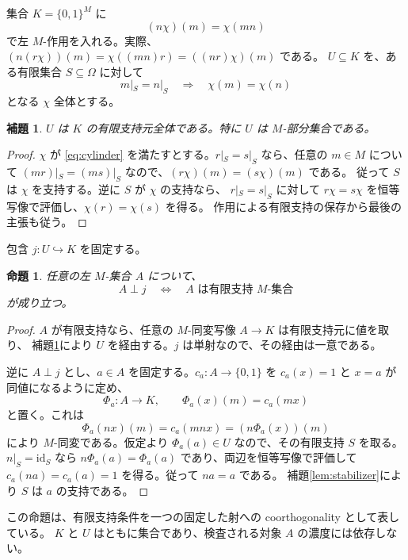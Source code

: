 \documentclass[a4paper,11pt]{ltjsarticle}
\theoremstyle{japaneseplain}
\newtheorem{lemma}[theorem]{補題}
\newtheorem{proposition}[theorem]{命題}
\newcommand{\id}{\mathrm{id}}
\begin{document}
集合 $K=\{0,1\}^{M}$ に
\begin{equation}\label{eq:cofree}
 (n\chi)(m)=\chi(mn)
\end{equation}
で左 $M$-作用を入れる。実際、
$(n(r\chi))(m)=\chi((mn)r)=((nr)\chi)(m)$ である。
$U\subseteq K$ を、ある有限集合 $S\subseteq\Omega$ に対して
\begin{equation}\label{eq:cylinder}
 m|_S=n|_S\quad\Longrightarrow\quad\chi(m)=\chi(n)
\end{equation}
となる $\chi$ 全体とする。

\begin{lemma}\label{lem:cylinder}
$U$ は $K$ の有限支持元全体である。特に $U$ は $M$-部分集合である。
\end{lemma}
\begin{proof}
$\chi$ が \eqref{eq:cylinder} を満たすとする。$r|_S=s|_S$ なら、任意の $m\in M$ について
$(mr)|_S=(ms)|_S$ なので、$(r\chi)(m)=(s\chi)(m)$ である。
従って $S$ は $\chi$ を支持する。逆に $S$ が $\chi$ の支持なら、
$r|_S=s|_S$ に対して $r\chi=s\chi$ を恒等写像で評価し、$\chi(r)=\chi(s)$ を得る。
作用による有限支持の保存から最後の主張も従う。
\end{proof}

包含 $j:U\hookrightarrow K$ を固定する。

\begin{proposition}\label{prop:supporttest}
任意の左 $M$-集合 $A$ について、
\[
 A\perp j\quad\Longleftrightarrow\quad A\text{ は有限支持 }M\text{-集合}
\]
が成り立つ。
\end{proposition}
\begin{proof}
$A$ が有限支持なら、任意の $M$-同変写像 $A\to K$ は有限支持元に値を取り、
補題\ref{lem:cylinder}により $U$ を経由する。$j$ は単射なので、その経由は一意である。

逆に $A\perp j$ とし、$a\in A$ を固定する。$c_a:A\to\{0,1\}$ を
$c_a(x)=1$ と $x=a$ が同値になるように定め、
\[
 \Phi_a:A\longrightarrow K,\qquad \Phi_a(x)(m)=c_a(mx)
\]
と置く。これは
\[
 \Phi_a(nx)(m)=c_a(mnx)=(n\Phi_a(x))(m)
\]
により $M$-同変である。仮定より $\Phi_a(a)\in U$ なので、その有限支持 $S$ を取る。
$n|_S=\id_S$ なら $n\Phi_a(a)=\Phi_a(a)$ であり、両辺を恒等写像で評価して
$c_a(na)=c_a(a)=1$ を得る。従って $na=a$ である。
補題\ref{lem:stabilizer}により $S$ は $a$ の支持である。
\end{proof}

この命題は、有限支持条件を一つの固定した射への coorthogonality として表している。
$K$ と $U$ はともに集合であり、検査される対象 $A$ の濃度には依存しない。
\end{document}
